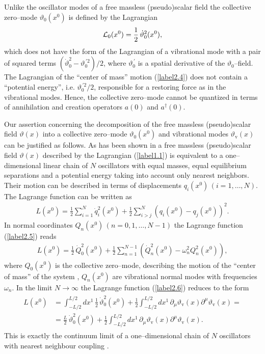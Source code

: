 \documentclass[a4paper,12pt] {article}
\begin{document}
Unlike the oscillator modes of a free massless (pseudo)scalar field
the collective zero--mode $\vartheta_0(x^0)$ is defined by the
Lagrangian
%
\begin{eqnarray}\label{label2.4}
{\cal L}_0(x^0) = \frac{1}{2}\,\dot{\vartheta}^2_0(x^0),
\end{eqnarray}
%
which does not have the form of the Lagrangian of a vibrational mode
with a pair of squared terms $(\dot{\vartheta}^2_0 -
\vartheta^{\,'2}_0)/2$, where $\vartheta^{\,'}_0$ is a spatial
derivative of the $\vartheta_0$--field. The Lagrangian of the ``center
of mass'' motion (\ref{label2.4}) does not contain a ``potential
energy'', i.e. $\vartheta^{\,'2}_0/2$, responsible for a restoring
force as in the vibrational modes. Hence, the collective zero--mode
cannot be quantized in terms of annihilation and creation operators
$a(0)$ and $a^{\dagger}(0)$.

Our assertion concerning the decomposition of the free massless
(pseudo)scalar field $\vartheta(x)$ into a collective zero--mode
$\vartheta_0(x^0)$ and vibrational modes $\vartheta_{\mathrm v}(x)$ can be justified
as follows. As has been shown in \cite{Wa80} a free massless
(pseudo)scalar field $\vartheta(x)$ described by the Lagrangian
(\ref{label1.1}) is equivalent to a one--dimensional linear chain of
$N$ oscillators with equal masses, equal equilibrium separations and a
potential energy taking into account only nearest neighbors. Their
motion can be described in terms of displacements $q_i(x^0)\,(i =
1,\ldots,N)$. The Lagrange function can be written as \cite{Wa80}
%
\begin{eqnarray}\label{label2.5}
L(x^0) = \frac{1}{2}\sum^N_{i = 1}\dot{q}^2_i(x^0) +
\frac{1}{2}\sum^{N}_{i>j} (q_i(x^0) - q_j(x^0))^2.
\end{eqnarray}
%
In normal coordinates $Q_n(x^0)\,(n = 0, 1,\ldots, N - 1)$ the
Lagrange function (\ref{label2.5}) reads
%
\begin{eqnarray}\label{label2.6}
L(x^0) = \frac{1}{2}\,\dot{Q}^2_0(x^0) + \frac{1}{2}\sum^{N-1}_{n =
1}(\dot{Q}^2_n(x^0) - \omega^2_nQ^2_n(x^0)),
\end{eqnarray}
%
where $Q_0(x^0)$ is the collective zero--mode, describing the motion
of the ``center of mass'' of the system \cite{th0112184}, $Q_n(x^0)$
are vibrational normal modes with frequencies $\omega_n$. In the limit
$N \to \infty$ the Lagrange function (\ref{label2.6}) reduces to the
form \cite{Wa80}
%
\begin{eqnarray}\label{label2.7}
\begin{aligned}
L(x^0) &= \int^{L/2}_{-L/2}dx^1\,\frac{1}{2}\,\dot{\vartheta}^2_0(x^0)
+ \frac{1}{2} \int^{L/2}_{-L/2}dx^1\,\partial_{\mu}\vartheta_{\mathrm
v}(x) \partial^{\mu}\vartheta_{\mathrm v}(x)=\\
&=\frac{L}{2}\,\dot{\vartheta}^2_0(x^0) + \frac{1}{2}
\int^{L/2}_{-L/2}dx^1\,\partial_{\mu}\vartheta_{\mathrm
v}(x)\partial^{\mu}\vartheta_{\mathrm v}(x).
\end{aligned}
\end{eqnarray}
%
This is exactly the continuum limit of a one--dimensional chain of $N$
oscillators with nearest neighbour coupling \cite{Wa80}.
\end{document}
